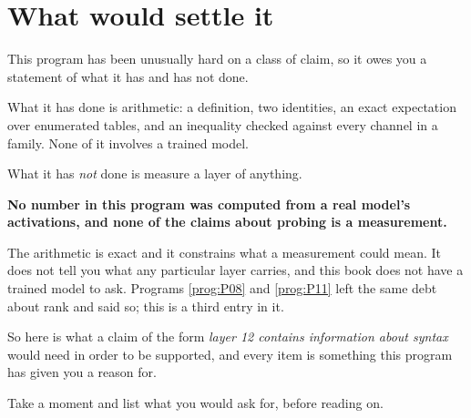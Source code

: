 \section{What would settle it}
\label{sec:P31-notmeasured}

\begin{fr}
This program has been unusually hard on a class of claim, so it owes you a
statement of what it has and has not done.

What it has done is arithmetic: a definition, two identities, an exact
expectation over enumerated tables, and an inequality checked against every
channel in a family. None of it involves a trained model.

What it has \emph{not} done is measure a layer of anything.

\begin{warning}
\textbf{No number in this program was computed from a real model's
activations, and none of the claims about probing is a measurement.}

The arithmetic is exact and it constrains what a measurement could mean. It
does not tell you what any particular layer carries, and this book does not
have a trained model to ask. Programs \ref{prog:P08} and \ref{prog:P11} left
the same debt about rank and said so; this is a third entry in it.
\end{warning}
\end{fr}

\begin{fr}
So here is what a claim of the form \emph{layer 12 contains information about
syntax} would need in order to be supported, and every item is something this
program has given you a reason for.

Take a moment and list what you would ask for, before reading on.
\dotline
\nextframe
\end{fr}

